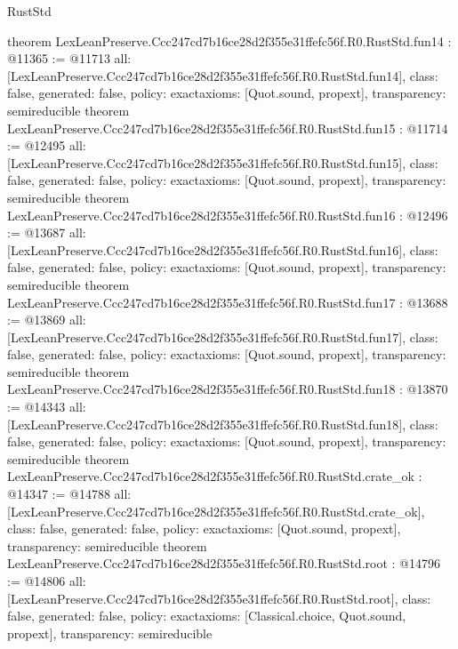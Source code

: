 \begin{lexlean}{RustStd}
\begin{coremodule}
{}
theorem LexLeanPreserve.Ccc247cd7b16ce28d2f355e31ffefc56f.R0.RustStd.fun14 : @11365 := @11713 {
  all: [LexLeanPreserve.Ccc247cd7b16ce28d2f355e31ffefc56f.R0.RustStd.fun14],
  class: false,
  generated: false,
  policy: exact{axioms: [Quot.sound, propext]},
  transparency: semireducible
}
theorem LexLeanPreserve.Ccc247cd7b16ce28d2f355e31ffefc56f.R0.RustStd.fun15 : @11714 := @12495 {
  all: [LexLeanPreserve.Ccc247cd7b16ce28d2f355e31ffefc56f.R0.RustStd.fun15],
  class: false,
  generated: false,
  policy: exact{axioms: [Quot.sound, propext]},
  transparency: semireducible
}
theorem LexLeanPreserve.Ccc247cd7b16ce28d2f355e31ffefc56f.R0.RustStd.fun16 : @12496 := @13687 {
  all: [LexLeanPreserve.Ccc247cd7b16ce28d2f355e31ffefc56f.R0.RustStd.fun16],
  class: false,
  generated: false,
  policy: exact{axioms: [Quot.sound, propext]},
  transparency: semireducible
}
theorem LexLeanPreserve.Ccc247cd7b16ce28d2f355e31ffefc56f.R0.RustStd.fun17 : @13688 := @13869 {
  all: [LexLeanPreserve.Ccc247cd7b16ce28d2f355e31ffefc56f.R0.RustStd.fun17],
  class: false,
  generated: false,
  policy: exact{axioms: [Quot.sound, propext]},
  transparency: semireducible
}
theorem LexLeanPreserve.Ccc247cd7b16ce28d2f355e31ffefc56f.R0.RustStd.fun18 : @13870 := @14343 {
  all: [LexLeanPreserve.Ccc247cd7b16ce28d2f355e31ffefc56f.R0.RustStd.fun18],
  class: false,
  generated: false,
  policy: exact{axioms: [Quot.sound, propext]},
  transparency: semireducible
}
theorem LexLeanPreserve.Ccc247cd7b16ce28d2f355e31ffefc56f.R0.RustStd.crate_ok : @14347 := @14788 {
  all: [LexLeanPreserve.Ccc247cd7b16ce28d2f355e31ffefc56f.R0.RustStd.crate_ok],
  class: false,
  generated: false,
  policy: exact{axioms: [Quot.sound, propext]},
  transparency: semireducible
}
theorem LexLeanPreserve.Ccc247cd7b16ce28d2f355e31ffefc56f.R0.RustStd.root : @14796 := @14806 {
  all: [LexLeanPreserve.Ccc247cd7b16ce28d2f355e31ffefc56f.R0.RustStd.root],
  class: false,
  generated: false,
  policy: exact{axioms: [Classical.choice, Quot.sound, propext]},
  transparency: semireducible
}


\end{coremodule}
\end{lexlean}
